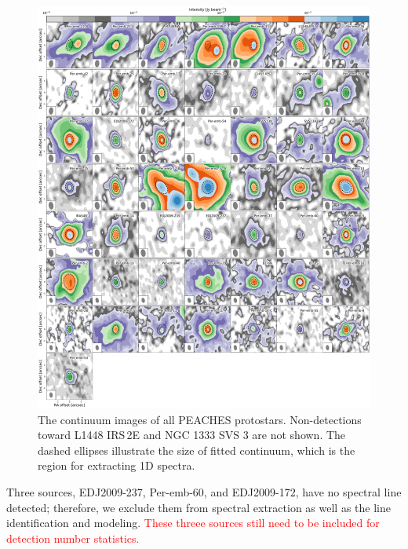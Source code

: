 \documentclass[twocolumn]{aastex62}
\begin{document}
\begin{figure}[htbp!]
  \centering
  \includegraphics[width=\textwidth]{all_continuum.pdf}
  \caption{The continuum images of all PEACHES protostars.  Non-detections toward L1448 IRS\,2E and NGC 1333 SVS 3 are not shown.  The dashed ellipses illustrate the size of fitted continuum, which is the region for extracting 1D spectra.}
  \label{fig:continuum}
\end{figure}

Three sources, EDJ2009-237, Per-emb-60, and EDJ2009-172, have no spectral line detected; therefore, we exclude them from spectral extraction as well as the line identification and modeling.  \textcolor{red}{These threee sources still need to be included for detection number statistics.}
\end{document}
